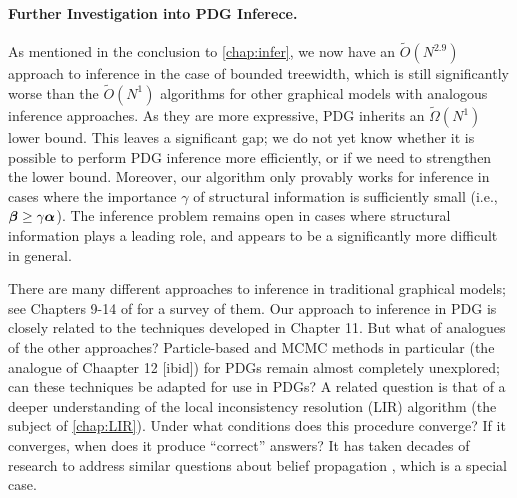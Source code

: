 \paragraph{Further Investigation into PDG Inferece.}
As mentioned in the conclusion to \cref{chap:infer}, we now have an $\tilde O(N^{2.9})$ approach to inference in the case of bounded treewidth,
which is still significantly worse than the $\tilde O(N^1)$ algorithms for other graphical models with analogous inference approaches.
As they are more expressive, PDG inherits an $\tilde \Omega(N^1)$ lower bound.
This leaves a significant gap;
we do not yet know whether it is possible to perform PDG inference more efficiently, or if we need to strengthen the lower bound. 
Moreover, our algorithm only provably works for inference in cases where 
    the importance $\gamma$ of structural information is sufficiently small
        (i.e., $\boldsymbol\beta \ge \gamma\boldsymbol\alpha$). 
The inference problem remains open in cases where structural information plays a leading role, and appears to be a significantly more difficult in general. 

There are many different approaches to inference in traditional graphical models;
see Chapters 9-14 of \citet{KF09} for a survey of them.
Our approach to inference in PDG is closely related to the techniques developed in Chapter 11. But what of analogues of the other approaches? 
Particle-based and MCMC methods in particular (the analogue of Chaapter 12 [ibid])
for PDGs remain almost completely unexplored; can these techniques be adapted for use in PDGs?
%    
%
A related question is that of a deeper understanding of the local inconsistency resolution (LIR) algorithm (the subject of \cref{chap:LIR}). 
Under what conditions does this procedure converge?
If it converges, when does it produce ``correct'' answers?
It has taken decades of research to address similar questions about belief propagation \citep{yedida-genbp,wiegerinck-fracbp,minka2005divergence}, which is a special case.



